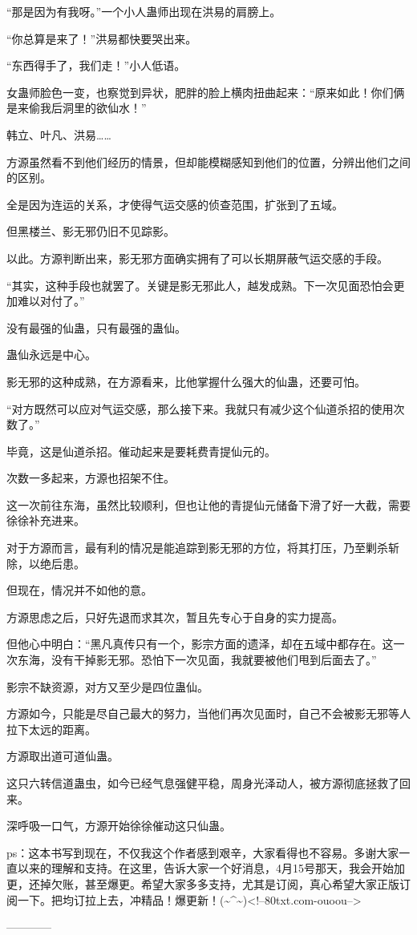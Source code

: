 \begin{this_body}
“那是因为有我呀。”一个小人蛊师出现在洪易的肩膀上。

“你总算是来了！”洪易都快要哭出来。

“东西得手了，我们走！”小人低语。

女蛊师脸色一变，也察觉到异状，肥胖的脸上横肉扭曲起来：“原来如此！你们俩是来偷我后洞里的欲仙水！”

韩立、叶凡、洪易……

方源虽然看不到他们经历的情景，但却能模糊感知到他们的位置，分辨出他们之间的区别。

全是因为连运的关系，才使得气运交感的侦查范围，扩张到了五域。

但黑楼兰、影无邪仍旧不见踪影。

以此。方源判断出来，影无邪方面确实拥有了可以长期屏蔽气运交感的手段。

“其实，这种手段也就罢了。关键是影无邪此人，越发成熟。下一次见面恐怕会更加难以对付了。”

没有最强的仙蛊，只有最强的蛊仙。

蛊仙永远是中心。

影无邪的这种成熟，在方源看来，比他掌握什么强大的仙蛊，还要可怕。

“对方既然可以应对气运交感，那么接下来。我就只有减少这个仙道杀招的使用次数了。”

毕竟，这是仙道杀招。催动起来是要耗费青提仙元的。

次数一多起来，方源也招架不住。

这一次前往东海，虽然比较顺利，但也让他的青提仙元储备下滑了好一大截，需要徐徐补充进来。

对于方源而言，最有利的情况是能追踪到影无邪的方位，将其打压，乃至剿杀斩除，以绝后患。

但现在，情况并不如他的意。

方源思虑之后，只好先退而求其次，暂且先专心于自身的实力提高。

但他心中明白：“黑凡真传只有一个，影宗方面的遗泽，却在五域中都存在。这一次东海，没有干掉影无邪。恐怕下一次见面，我就要被他们甩到后面去了。”

影宗不缺资源，对方又至少是四位蛊仙。

方源如今，只能是尽自己最大的努力，当他们再次见面时，自己不会被影无邪等人拉下太远的距离。

方源取出道可道仙蛊。

这只六转信道蛊虫，如今已经气息强健平稳，周身光泽动人，被方源彻底拯救了回来。

深呼吸一口气，方源开始徐徐催动这只仙蛊。

ps：这本书写到现在，不仅我这个作者感到艰辛，大家看得也不容易。多谢大家一直以来的理解和支持。在这里，告诉大家一个好消息，4月15号那天，我会开始加更，还掉欠账，甚至爆更。希望大家多多支持，尤其是订阅，真心希望大家正版订阅一下。把均订拉上去，冲精品！爆更新！(\~{}\^{}\~{})<!--80txt.com-ouoou-->

------------

\end{this_body}


